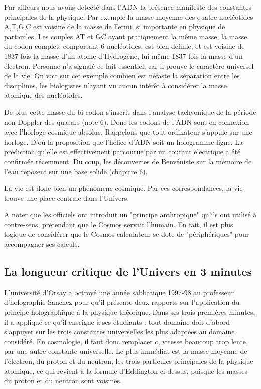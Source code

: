 \documentclass[a4paper,12pt]{article}
\begin{document}
    Par ailleurs nous avons détecté dans l'ADN la présence manifeste des constantes principales de la physique. Par exemple la masse moyenne des quatre nucléotides A,T,G,C est voisine de la masse de Fermi, si importante en physique de particules. Les couples AT et GC ayant pratiquement la même masse, la masse du codon complet, comportant 6 nucléotides, est bien définie, et est voisine de 1837 fois la masse d'un atome d'Hydrogène, lui-même 1837 fois la masse d'un électron. Personne n’a signalé ce fait essentiel, car il prouve le caractère universel de la vie. On voit sur cet exemple combien est néfaste la séparation entre les disciplines, les biologistes n’ayant vu aucun intérêt à considérer la masse atomique des nucléotides.

    De plus cette masse du bi-codon s'inscrit dans l'analyse tachyonique de la période non-Doppler des quasars (note 6). Donc les codons de l'ADN sont en connexion avec l'horloge cosmique absolue. Rappelons que tout ordinateur s'appuie sur une horloge. D'où la proposition que l'hélice d'ADN soit un hologramme-ligne. La prédiction qu'elle est effectivement parcourue par un courant électrique a été confirmée récemment. Du coup, les découvertes de Benvéniste sur la mémoire de l'eau reposent sur une base solide  (chapitre 6).

La vie est donc bien un phénomène cosmique. Par ces correspondances, la vie trouve une place centrale dans l'Univers. 

A noter que les officiels ont introduit un "principe anthropique" qu'ils ont utilisé à contre-sens, prétendant que le Cosmos servait l’humain. En fait, il est plus logique de considérer que le Cosmos calculateur se dote de  "périphériques" pour accompagner ses calculs. 


\subsection{La longueur critique de l'Univers en 3 minutes}

     L'université d'Orsay a octroyé une année sabbatique 1997-98 au professeur d'holographie Sanchez pour qu'il présente deux rapports sur l'application du principe holographique à la physique théorique. Dans ses trois premières minutes, il a appliqué ce qu'il enseigne à ses étudiants : tout domaine doit d'abord s'appuyer sur les trois constantes universelles les plus adaptées au domaine considéré. En cosmologie, il faut donc remplacer c, vitesse beaucoup trop lente, par une autre constante universelle. Le plus immédiat est la masse moyenne de l'électron, du proton et du neutron, les trois particules principales de la physique atomique, ce qui revient à la formule d'Eddington ci-dessus, puisque les masses du proton et du neutron sont voisines. 
\end{document}
